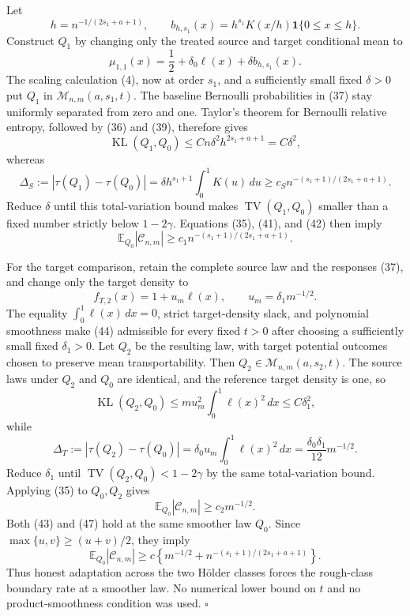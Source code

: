 Let
\[
h=n^{-1/(2s_1+a+1)},
\qquad
b_{h,s_1}(x)=h^{s_1}K(x/h)\mathbf 1\{0\le x\le h\}.
\tag{39}
\]
Construct \(Q_1\) by changing only the treated source and target conditional mean to
\[
\mu_{1,1}(x)=\frac12+\delta_0\ell(x)+\delta b_{h,s_1}(x).
\tag{40}
\]
The scaling calculation (4), now at order \(s_1\), and a sufficiently small fixed \(\delta>0\) put \(Q_1\) in \(\mathcal M_{n,m}(a,s_1,t)\).  The baseline Bernoulli probabilities in (37) stay uniformly separated from zero and one.  Taylor's theorem for Bernoulli relative entropy, followed by (36) and (39), therefore gives
\[
\operatorname{KL}(Q_1,Q_0)
\le Cn\delta^2h^{2s_1+a+1}
=C\delta^2,
\tag{41}
\]
whereas
\[
\Delta_S:=|\tau(Q_1)-\tau(Q_0)|
=\delta h^{s_1+1}\int_0^1K(u)\,du
\ge c_Sn^{-(s_1+1)/(2s_1+a+1)}.
\tag{42}
\]
Reduce \(\delta\) until this total-variation bound makes \(\operatorname{TV}(Q_1,Q_0)\) smaller than a fixed number strictly below \(1-2\gamma\).  Equations (35), (41), and (42) then imply
\[
\mathbb E_{Q_0}|\mathcal C_{n,m}|
\ge c_1n^{-(s_1+1)/(2s_1+a+1)}.
\tag{43}
\]

For the target comparison, retain the complete source law and the responses (37), and change only the target density to
\[
f_{T,2}(x)=1+u_m\ell(x),
\qquad
u_m=\delta_1m^{-1/2}.
\tag{44}
\]
The equality \(\int_0^1\ell(x)\,dx=0\), strict target-density slack, and polynomial smoothness make (44) admissible for every fixed \(t>0\) after choosing a sufficiently small fixed \(\delta_1>0\).  Let \(Q_2\) be the resulting law, with target potential outcomes chosen to preserve mean transportability.  Then \(Q_2\in\mathcal M_{n,m}(a,s_2,t)\).  The source laws under \(Q_2\) and \(Q_0\) are identical, and the reference target density is one, so
\[
\operatorname{KL}(Q_2,Q_0)
\le m u_m^2\int_0^1\ell(x)^2\,dx
\le C\delta_1^2,
\tag{45}
\]
while
\[
\Delta_T:=|\tau(Q_2)-\tau(Q_0)|
=\delta_0u_m\int_0^1\ell(x)^2\,dx
=\frac{\delta_0\delta_1}{12}m^{-1/2}.
\tag{46}
\]
Reduce \(\delta_1\) until \(\operatorname{TV}(Q_2,Q_0)<1-2\gamma\) by the same total-variation bound.  Applying (35) to \(Q_0,Q_2\) gives
\[
\mathbb E_{Q_0}|\mathcal C_{n,m}|
\ge c_2m^{-1/2}.
\tag{47}
\]
Both (43) and (47) hold at the same smoother law \(Q_0\).  Since \(\max\{u,v\}\ge(u+v)/2\), they imply
\[
\mathbb E_{Q_0}|\mathcal C_{n,m}|
\ge c\left\{m^{-1/2}+n^{-(s_1+1)/(2s_1+a+1)}\right\}.
\]
Thus honest adaptation across the two H\"older classes forces the rough-class boundary rate at a smoother law.  No numerical lower bound on \(t\) and no product-smoothness condition was used. \(\square\)